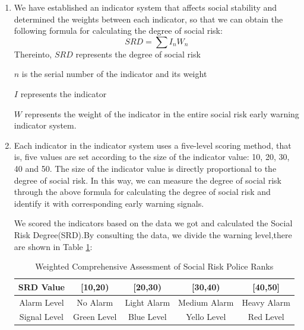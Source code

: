 \documentclass[12pt]{article}  %
\begin{document}
\begin{enumerate}
	\renewcommand{\labelenumi}{\textbf{Step \theenumi}}
\item We have established an indicator system that affects social stability and determined the weights between each indicator, so that we can obtain the following formula for calculating the degree of social risk:
\begin{equation}
	SRD=\sum I_nW_n
	\label{eq}
\end{equation}
Thereinto, $SRD$ represents the degree of social risk

\hspace{4.5em}$n$ is the serial number of the indicator and its weight

\hspace{4.5em}$I$ represents the indicator

\hspace{4.5em}$W$ represents the weight of the indicator in the entire social risk early warning indicator system.
\item Each indicator in the indicator system uses a five-level scoring method, that is, five values are set according to the size of the indicator value: 10, 20, 30, 40 and 50. The size of the indicator value is directly proportional to the degree of social risk. In this way, we can measure the degree of social risk through the above formula for calculating the degree of social risk and identify it with corresponding early warning signals.

We scored the indicators based on the data we got and calculated the Social Risk Degree(SRD).By consulting the data, we divide the warning level,there are shown in Table \ref{srd}:
\begin{table}[!ht]  
    \centering
    \caption{Weighted Comprehensive Assessment of Social Risk Police Ranks}
    \label{srd}
    \begin{tabular}{ccccc}
    \hline
        SRD Value & [10,20) & [20,30) & [30,40) & [40,50] \\\hline 
        Alarm Level & No Alarm & Light Alarm & Medium Alarm & Heavy Alarm \\ 
        Signal Level& Green Level& Blue Level& Yello Level& Red Level\\ \hline
    \end{tabular} 
\end{table}
\end{enumerate}
\end{document}

